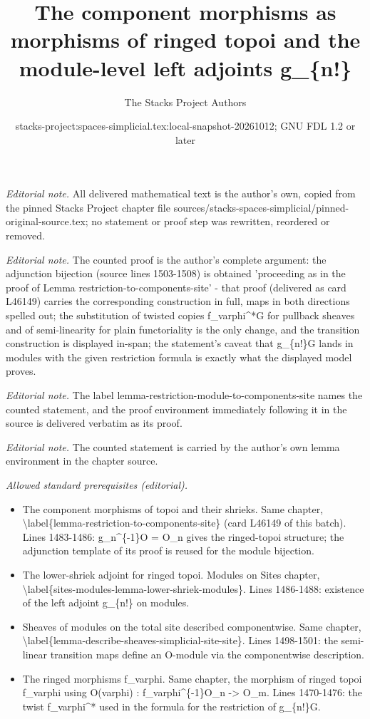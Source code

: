 \documentclass{stacks-project}
\title{The component morphisms as morphisms of ringed topoi and the module-level left adjoints g\_\{n!\}}
\author{The Stacks Project Authors}
\date{stacks-project:spaces-simplicial.tex:local-snapshot-20261012; GNU FDL 1.2 or later}
\theoremstyle{plain}
\theoremstyle{definition}
\theoremstyle{remark}
\numberwithin{equation}{subsection}
\begin{document}
\maketitle
\noindent\textit{Editorial note.} All delivered mathematical text is the author's own, copied from the pinned Stacks Project chapter file sources/stacks-spaces-simplicial/pinned-original-source.tex; no statement or proof step was rewritten, reordered or removed.\par\medskip
\noindent\textit{Editorial note.} The counted proof is the author's complete argument: the adjunction bijection (source lines 1503-1508) is obtained 'proceeding as in the proof of Lemma restriction-to-components-site' - that proof (delivered as card L46149) carries the corresponding construction in full, maps in both directions spelled out; the substitution of twisted copies f\_varphi\textasciicircum{}*G for pullback sheaves and of semi-linearity for plain functoriality is the only change, and the transition construction is displayed in-span; the statement's caveat that g\_\{n!\}G lands in modules with the given restriction formula is exactly what the displayed model proves.\par\medskip
\noindent\textit{Editorial note.} The label lemma-restriction-module-to-components-site names the counted statement, and the proof environment immediately following it in the source is delivered verbatim as its proof.\par\medskip
\noindent\textit{Editorial note.} The counted statement is carried by the author's own lemma environment in the chapter source.\par\medskip
\noindent\textit{Allowed standard prerequisites (editorial).}\begin{itemize}
\item The component morphisms of topoi and their shrieks. Same chapter, \textbackslash{}label\{lemma-restriction-to-components-site\} (card L46149 of this batch). Lines 1483-1486: g\_n\textasciicircum{}\{-1\}O = O\_n gives the ringed-topoi structure; the adjunction template of its proof is reused for the module bijection.
\item The lower-shriek adjoint for ringed topoi. Modules on Sites chapter, \textbackslash{}label\{sites-modules-lemma-lower-shriek-modules\}. Lines 1486-1488: existence of the left adjoint g\_\{n!\} on modules.
\item Sheaves of modules on the total site described componentwise. Same chapter, \textbackslash{}label\{lemma-describe-sheaves-simplicial-site-site\}. Lines 1498-1501: the semi-linear transition maps define an O-module via the componentwise description.
\item The ringed morphisms f\_varphi. Same chapter, the morphism of ringed topoi f\_varphi using O(varphi) : f\_varphi\textasciicircum{}\{-1\}O\_n -> O\_m. Lines 1470-1476: the twist f\_varphi\textasciicircum{}* used in the formula for the restriction of g\_\{n!\}G.
\end{itemize}\medskip
\end{document}
